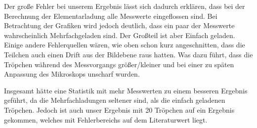 \documentclass{scrartcl}
\begin{document}
	Der große Fehler bei unserem Ergebnis lässt sich dadurch erklären, dass bei der Berechnung
	der Elementarladung alle Messwerte eingeflossen sind. Bei Betrachtung der Grafiken wird jedoch deutlich,
	dass ein paar der Messwerte wahrscheinlich Mehrfachgeladen sind. Der Großteil ist aber Einfach geladen.
	Einige andere Fehlerquellen wären, wie oben schon kurz angeschnitten, dass die Teilchen auch einen Drift 
	aus der Bildebene raus hatten. Was dazu führt, dass die Tröpchen während des Messvorgangs größer/kleiner und
	bei einer zu späten Anpassung des Mikroskops unscharf wurden.

	Insgesamt hätte eine Statistik mit mehr Messwerten zu einem besseren Ergebnis geführt, da die Mehrfachladungen
	seltener sind, als die einfach geladenen Tröpchen. Jedoch ist auch unser Ergebnis mit 20 Tröpchen auf
	ein Ergebnis gekommen, welches mit Fehlerbereichs auf dem Literaturwert liegt.
\end{document}

